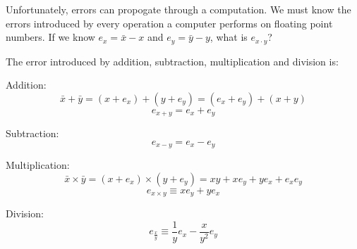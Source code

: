 Unfortunately, errors can propogate through a computation. We must know the
errors introduced by every operation a computer performs on floating point
numbers. If we know $e_x = \bar{x} - x$ and $e_y = \bar{y} - y$, what is $e_{x
\cdot y}$?

The error introduced by addition, subtraction, multiplication and division is:

\begin{description}
  \item Addition:
  \[
    \bar{x} + \bar{y} = (x + e_x) + (y + e_y) = (e_x + e_y) + (x + y)
  \]
  \[
    e_{x+y} = e_x + e_y
  \]
  \item Subtraction:
  \[
    e_{x-y} = e_x - e_y
  \]
  \item Multiplication:
  \[
    \bar{x} \times \bar{y} = (x + e_x) \times (y + e_y) = xy + xe_y + ye_x + e_xe_y
  \]
  \[
    e_{x \times y} \equiv xe_y + ye_x
  \]
  \item Division:
  \[
    e_\frac{x}{y} \equiv \frac{1}{y}e_x - \frac{x}{y^2}e_y
  \]
\end{description}

